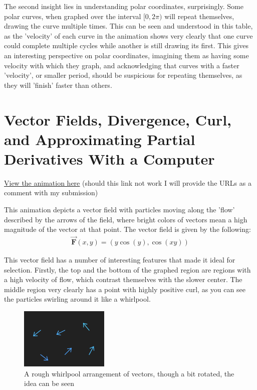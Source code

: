 \documentclass{article}
\begin{document}
    The second insight lies in understanding polar coordinates, surprisingly.
    Some polar curves, when graphed over the interval $[0, 2\pi)$ will repeat themselves, drawing the curve multiple times.
    This can be seen and understood in this table, as the 'velocity' of each curve in the animation shows very clearly that
    one curve could complete multiple cycles while another is still drawing its first.
    This gives an interesting perspective on polar coordinates, imagining them as having some velocity with which they graph,
    and acknowledging that curves with a faster 'velocity', or smaller period, should be suspicious for repeating themselves, as they will 'finish' faster than others.

    \section{Vector Fields, Divergence, Curl, and Approximating Partial Derivatives With a Computer}
    \underline{\href{https://saxten2011.github.io/VectorField/}{View the animation here}} (should this link not work I will provide the URLs as a comment with my submission)

    This animation depicts a vector field with particles moving along the 'flow' described by the arrows of the field, where bright colors of vectors mean a high magnitude of the vector at that point.
    The vector field is given by the following:
    \begin{gather*}
        \vec{ \mathbf{F} } (x, y) = (y \cos(y), \cos(xy)) 
    \end{gather*}

    This vector field has a number of interesting features that made it ideal for selection.
    Firstly, the top and the bottom of the graphed region are regions with a high velocity of flow, which contrast themselves with the slower center.
    The middle region very clearly has a point with highly positive curl, as you can see the particles swirling around it like a whirlpool.

    \begin{figure}[!h]
        \centering
        \includegraphics{whirlpoolish}
        \caption{A rough whirlpool arrangement of vectors, though a bit rotated, the idea can be seen}
    \end{figure}
\end{document}
